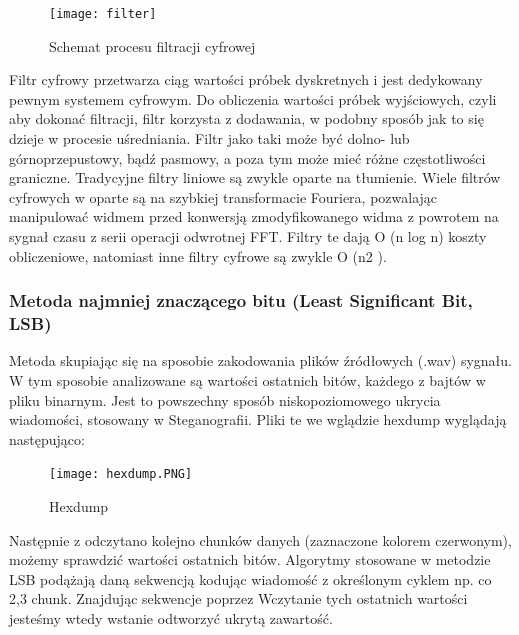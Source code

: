 \documentclass[a4paper,titleauthor]{mwart}
\begin{document}
	\begin{figure}[ht]
		\centering
		\texttt{[image: filter]}
		\caption{Schemat procesu filtracji cyfrowej}
	\end{figure}
	
	Filtr cyfrowy przetwarza ciąg wartości próbek dyskretnych i jest dedykowany pewnym systemem cyfrowym. Do obliczenia wartości próbek wyjściowych, czyli aby dokonać filtracji, filtr korzysta z dodawania, w podobny sposób jak to się dzieje w procesie uśredniania. 
	\newline\newline
	Filtr jako taki może być dolno- lub górnoprzepustowy, bądź pasmowy, a poza tym może mieć różne częstotliwości graniczne.
	\newline\newline
	Tradycyjne filtry liniowe są zwykle oparte na tłumienie.
	Wiele filtrów cyfrowych w oparte są na szybkiej transformacie Fouriera, pozwalając manipulować widmem przed konwersją zmodyfikowanego widma z powrotem na sygnał czasu z serii operacji odwrotnej FFT. Filtry te dają O (n log n) koszty obliczeniowe, natomiast inne filtry cyfrowe są zwykle O (n2 ).\newline\newline
	
	\subsubsection{Metoda najmniej znaczącego bitu (Least Significant Bit, LSB)}
	
	Metoda skupiając się na sposobie zakodowania plików źródłowych (.wav) sygnału. W tym sposobie analizowane są wartości ostatnich bitów, każdego z bajtów w pliku binarnym. Jest to powszechny sposób niskopoziomowego ukrycia wiadomości, stosowany w Steganografii.
	\newline \newline
	Pliki te we wglądzie hexdump wyglądają następująco:
	
	\begin{figure}[ht]
		\centering
		\texttt{[image: hexdump.PNG]}
		\caption{Hexdump}
	\end{figure}
	
	Następnie z odczytano kolejno chunków danych (zaznaczone kolorem czerwonym), możemy sprawdzić wartości ostatnich bitów. Algorytmy stosowane w metodzie LSB podążają daną sekwencją kodując wiadomość z określonym cyklem np. co 2,3 chunk. Znajdując sekwencje poprzez Wczytanie tych ostatnich wartości jesteśmy wtedy wstanie odtworzyć ukrytą zawartość.\newline\newline
	
\end{document}
